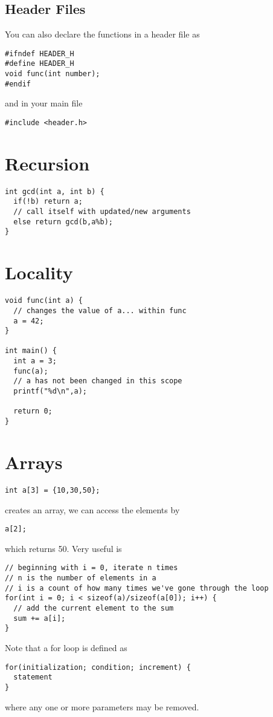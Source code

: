 \documentclass[12pt]{article}
\begin{document}
\subsection*{Header Files}
You can also declare the functions in a header file as
\begin{verbatim}
#ifndef HEADER_H
#define HEADER_H
void func(int number);
#endif
\end{verbatim}
and in your main file \begin{verbatim}#include <header.h>\end{verbatim}

\section*{Recursion}
\begin{verbatim}
int gcd(int a, int b) {
  if(!b) return a;
  // call itself with updated/new arguments
  else return gcd(b,a%b);
}
\end{verbatim}

\section*{Locality}
\begin{verbatim}
void func(int a) {
  // changes the value of a... within func
  a = 42;
}

int main() {
  int a = 3;
  func(a);
  // a has not been changed in this scope
  printf("%d\n",a);
  
  return 0;
}
\end{verbatim}

\section*{Arrays}
\begin{verbatim}int a[3] = {10,30,50};\end{verbatim} creates an array, we can access the elements by \begin{verbatim}a[2];\end{verbatim} which returns 50. Very useful is
\begin{verbatim}
// beginning with i = 0, iterate n times
// n is the number of elements in a
// i is a count of how many times we've gone through the loop
for(int i = 0; i < sizeof(a)/sizeof(a[0]); i++) {
  // add the current element to the sum
  sum += a[i];
}
\end{verbatim}

Note that a for loop is defined as
\begin{verbatim}
for(initialization; condition; increment) {
  statement
}
\end{verbatim}
where any one or more parameters may be removed.
\end{document}
